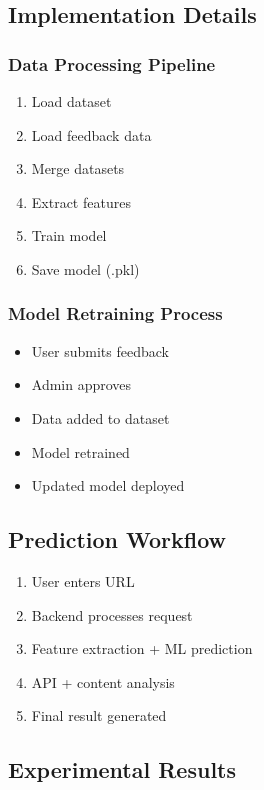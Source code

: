 \subsection{Implementation Details}

\subsubsection{Data Processing Pipeline}

\begin{enumerate}
	\item Load dataset
	\item Load feedback data
	\item Merge datasets
	\item Extract features
	\item Train model
	\item Save model (.pkl)
\end{enumerate}

\subsubsection{Model Retraining Process}

\begin{itemize}
	\item User submits feedback
	\item Admin approves
	\item Data added to dataset
	\item Model retrained
	\item Updated model deployed
\end{itemize}

\subsection{Prediction Workflow}

\begin{enumerate}
	\item User enters URL
	\item Backend processes request
	\item Feature extraction + ML prediction
	\item API + content analysis
	\item Final result generated
\end{enumerate}

\subsection{Experimental Results}

